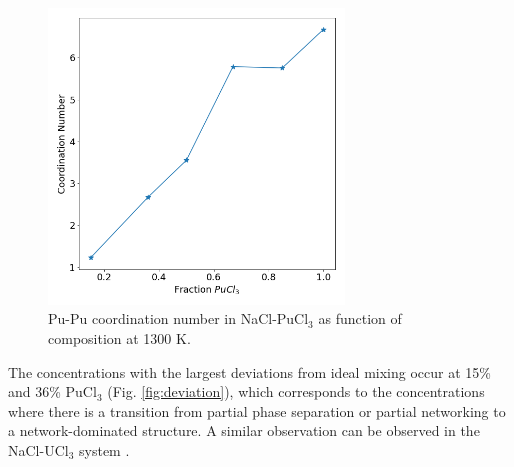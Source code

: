 \documentclass[review]{elsarticle}
\begin{document}
\begin{figure}[h!]
 \centering
 \includegraphics[width=0.7\textwidth]{coordination_number.png} 
 \caption{Pu-Pu coordination number in NaCl-PuCl$_3$ as function of composition at 1300 K.}
 \label{fig:coordination_number}
\end{figure}

The concentrations with the largest deviations from ideal mixing occur at 15\% and 36\% PuCl$_3$ (Fig. \ref{fig:deviation}), which corresponds to the concentrations where there is a transition from partial phase separation or partial networking to a network-dominated structure. A similar observation can be observed in the NaCl-UCl$_3$ system \cite{ANDERSSON2022153836}.
\

\FloatBarrier
\end{document}
